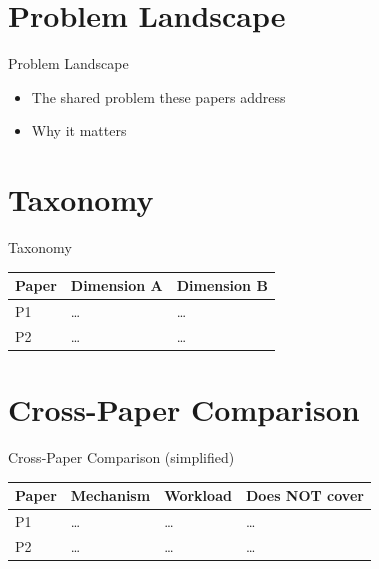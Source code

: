 \documentclass[aspectratio=169]{beamer}
\begin{document}
\section{Problem Landscape}
\begin{frame}{Problem Landscape}
  \begin{itemize}
    \item The shared problem these papers address
    \item Why it matters
  \end{itemize}
\end{frame}

\section{Taxonomy}
\begin{frame}{Taxonomy}
  \begin{center}
  \begin{tabular}{@{}lll@{}}
    \toprule
    Paper & Dimension A & Dimension B \\
    \midrule
    P1 & \dots & \dots \\
    P2 & \dots & \dots \\
    \bottomrule
  \end{tabular}
  \end{center}
\end{frame}

\section{Cross-Paper Comparison}
\begin{frame}{Cross-Paper Comparison (simplified)}
  \small
  \begin{center}
  \begin{tabular}{@{}llll@{}}
    \toprule
    Paper & Mechanism & Workload & Does NOT cover \\
    \midrule
    P1 & \dots & \dots & \dots \\
    P2 & \dots & \dots & \dots \\
    \bottomrule
  \end{tabular}
  \end{center}
\end{frame}
\end{document}
